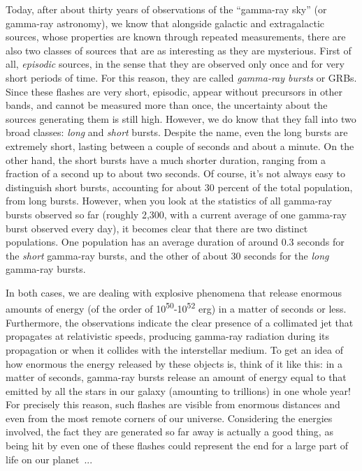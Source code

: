 Today, after about thirty years of observations of the ``gamma-ray sky'' (or gamma-ray
astronomy), we know that alongside galactic and extragalactic
sources, whose properties are known through repeated measurements, there are also two
classes of sources that are as interesting as they are mysterious. First of all,
\emph{episodic} sources, in the sense that they are observed only once and for very
short periods of time. For this reason, they are called \emph{gamma-ray
bursts} or GRBs. Since these flashes are very
short, episodic, appear without precursors in other bands, and cannot be measured more
than once, the uncertainty about the sources generating them is still high. However, we
do know that they fall into two broad classes: \emph{long} and \emph{short} bursts.
Despite the name, even the long bursts are extremely short, lasting between a couple of
seconds and about a minute. On the other hand, the short bursts have a much shorter
duration, ranging from a fraction of a second up to about two seconds. Of course, it's
not always easy to distinguish short bursts, accounting for about 30 percent of the
total population, from long bursts. However, when you look at the statistics of all
gamma-ray bursts observed so far (roughly 2,300, with a current average of one gamma-ray
burst observed every day), it becomes clear that there are two distinct populations. One
population has an average duration of around 0.3 seconds for the \emph{short} gamma-ray
bursts, and the other of about 30 seconds for the \emph{long}
gamma-ray bursts.

In both cases, we are dealing with explosive phenomena that release enormous amounts of
energy (of the order of 10\textsuperscript{50}-10\textsuperscript{52} erg) in a matter
of seconds or less. Furthermore, the observations indicate the clear presence of a
collimated jet that propagates at relativistic speeds, producing gamma-ray radiation
during its propagation or when it collides with the interstellar medium. To get an idea
of how enormous the energy released by these objects is, think of it
like this: in a matter of seconds, gamma-ray bursts release an amount of energy equal to
that emitted by all the stars in our galaxy (amounting to trillions) in one whole year!
For precisely this reason, such flashes are visible from enormous distances and even
from the most remote corners of our universe. Considering the energies involved, the
fact they are generated so far away is actually a good thing, as being hit by even one
of these flashes could represent the end for a large part of life on our planet~...

